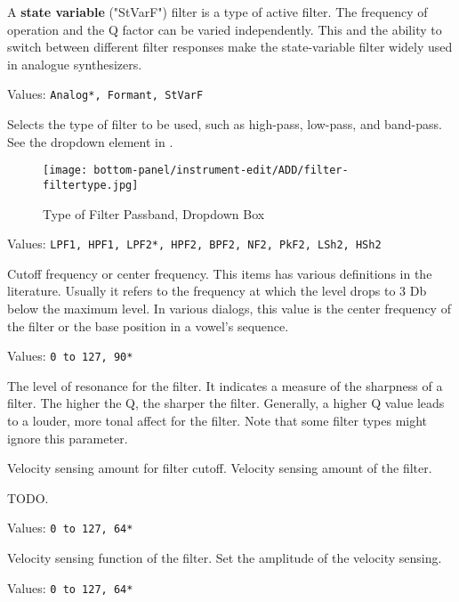    A \textbf{state variable} ("StVarF") filter
   is a type of active filter.
   The frequency of operation and the Q factor can be varied independently.
   This and the ability to switch between different filter responses make the
   state-variable filter widely used in analogue synthesizers.

   Values: \texttt{Analog*, Formant, StVarF}

   Selects the type of filter to be used, such as high-pass, low-pass,
   and band-pass.
   See the dropdown element in .

\begin{figure}[H]
   \centering 
   \texttt{[image: bottom-panel/instrument-edit/ADD/filter-filtertype.jpg]}
   \caption[Filter Type Dropdown]{Type of Filter Passband, Dropdown Box}
   \label{fig:filter_type_dropdown} 
\end{figure}

   Values: \texttt{LPF1, HPF1, LPF2*, HPF2, BPF2, NF2, PkF2, LSh2, HSh2}

   Cutoff frequency or center frequency.
   This items has various definitions in the literature. 
   Usually it refers to the frequency at which the level
   drops to 3 Db below the maximum level.
   In various dialogs, this value is the
   center frequency of the filter or the base position in
   a vowel's sequence.

   Values: \texttt{0 to 127, 90*}

   The level of resonance for the filter. 
   It indicates a measure of the sharpness of a filter.
   The higher the Q, the sharper the filter.
   Generally, a higher Q value leads to a louder, more tonal
   affect for the filter.
   Note that some filter types might ignore this parameter.

   Velocity sensing amount for filter cutoff.
   Velocity sensing amount of the filter.

   TODO.

   Values: \texttt{0 to 127, 64*}

   Velocity sensing function of the filter.
   Set the amplitude of the velocity sensing.

   Values: \texttt{0 to 127, 64*}

